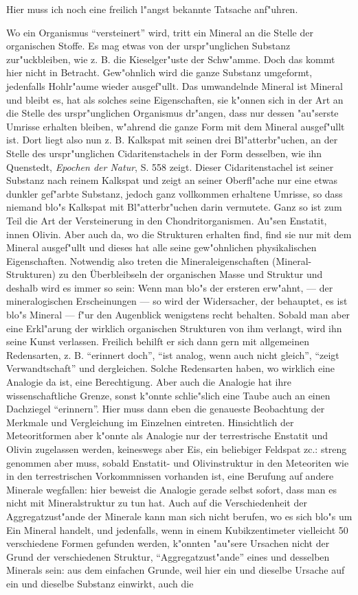 \documentclass[a4paper, 12pt, oneside]{article}
\begin{document}
Hier muss ich noch eine freilich l"angst bekannte Tatsache anf"uhren.

Wo ein Organismus "`versteinert"' wird, tritt ein Mineral an die Stelle der organischen Stoffe. Es mag etwas von der urspr"unglichen Substanz zur"uckbleiben, wie z. B. die Kieselger"uste der Schw"amme. Doch das kommt hier nicht in Betracht. Gew"ohnlich wird die ganze Substanz umgeformt, jedenfalls Hohlr"aume wieder ausgef"ullt. Das umwandelnde Mineral ist Mineral und bleibt es, hat als solches seine Eigenschaften, sie k"onnen sich in der Art an die Stelle des urspr"unglichen Organismus dr"angen, dass nur dessen "au"serste Umrisse erhalten bleiben, w"ahrend die ganze Form mit dem Mineral ausgef"ullt ist. Dort liegt also nun z. B. Kalkspat mit seinen drei Bl"atterbr"uchen, an der Stelle des urspr"unglichen Cidaritenstachels in der Form desselben, wie ihn Quenstedt, \emph{Epochen der Natur}, S. 558 zeigt. Dieser Cidaritenstachel ist seiner Substanz nach reinem Kalkspat und zeigt an seiner Oberfl"ache nur eine etwas dunkler gef"arbte Substanz, jedoch ganz vollkommen erhaltene Umrisse, so dass niemand blo"s Kalkspat mit Bl"atterbr"uchen darin vermutete. Ganz so ist zum Teil die Art der Versteinerung in den Chondritorganismen. Au"sen Enstatit, innen Olivin. Aber auch da, wo die Strukturen erhalten find, find sie nur mit dem Mineral ausgef"ullt und dieses hat alle seine gew"ohnlichen physikalischen Eigenschaften. Notwendig also treten die Mineraleigenschaften (Mineral-Strukturen) zu den Überbleibseln der organischen Masse und Struktur und deshalb wird es immer so sein: Wenn man blo"s der ersteren erw"ahnt, --- der mineralogischen Erscheinungen --- so wird der Widersacher, der behauptet, es ist blo"s Mineral --- f"ur den Augenblick wenigstens recht behalten. Sobald man aber eine Erkl"arung der wirklich organischen Strukturen von ihm verlangt, wird ihn seine Kunst verlassen. Freilich behilft er sich dann gern mit allgemeinen Redensarten, z. B. "`erinnert doch"', "`ist analog, wenn auch nicht gleich"', "`zeigt Verwandtschaft"' und dergleichen. Solche Redensarten haben, wo wirklich eine Analogie da ist, eine Berechtigung. Aber auch die Analogie hat ihre wissenschaftliche Grenze, sonst k"onnte schlie"slich eine Taube auch an einen Dachziegel "`erinnern"'. Hier muss dann eben die genaueste Beobachtung der Merkmale und Vergleichung im Einzelnen eintreten. Hinsichtlich der Meteoritformen aber k"onnte als Analogie nur der terrestrische Enstatit und Olivin zugelassen werden, keineswegs aber Eis, ein beliebiger Feldspat zc.: streng genommen aber muss, sobald Enstatit- und Olivinstruktur in den Meteoriten wie in den terrestrischen Vorkommnissen vorhanden ist, eine Berufung auf andere Minerale wegfallen: hier beweist die Analogie gerade selbst sofort, dass man es nicht mit Mineralstruktur zu tun hat. Auch auf die Verschiedenheit der Aggregatzust"ande der Minerale kann man sich nicht berufen, wo es sich blo"s um Ein Mineral handelt, und jedenfalls, wenn in einem Kubikzentimeter vielleicht 50 verschiedene Formen gefunden werden, k"onnten "au"sere Ursachen nicht der Grund der verschiedenen Struktur, "`Aggregatzust"ande"' eines und desselben Minerals sein: aus dem einfachen Grunde, weil hier ein und dieselbe Ursache auf ein und dieselbe Substanz einwirkt, auch die 
\end{document}
